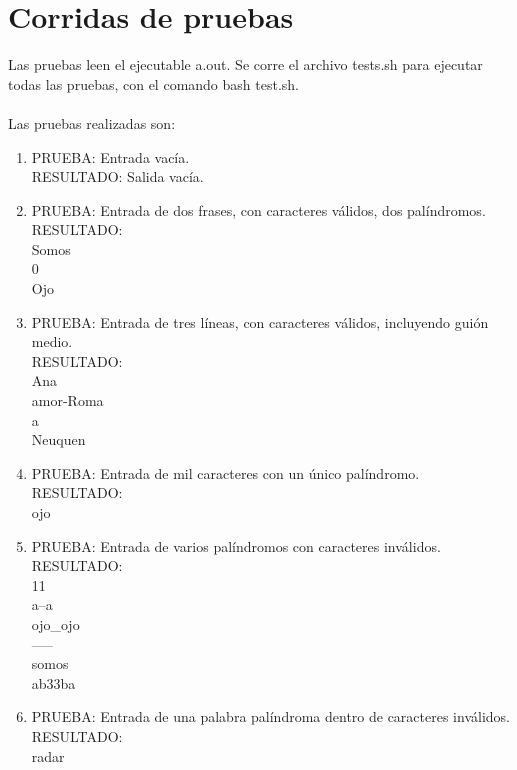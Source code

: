 \documentclass[a4paper,10pt]{article}
\begin{document}
\section{Corridas de pruebas}
Las pruebas leen el ejecutable a.out. Se corre el archivo tests.sh para ejecutar todas las pruebas, con el comando bash test.sh.\\
\\
Las pruebas realizadas son:\\
\begin{enumerate}[1.]
	\item PRUEBA: Entrada vac\'ia.\\
	RESULTADO: Salida vac\'ia.\\

	\item PRUEBA: Entrada de dos frases, con caracteres v\'alidos, dos pal\'indromos.\\
	RESULTADO:\\
	Somos\\
	0\\
	Ojo\\

	\item PRUEBA: Entrada de tres l\'ineas, con caracteres v\'alidos, incluyendo gui\'on medio.\\
	RESULTADO:\\
	Ana\\
	amor-Roma\\
	a\\
	Neuquen\\

	\item PRUEBA: Entrada de mil caracteres con un \'unico pal\'indromo.\\
	RESULTADO:\\
	ojo\\

	\item PRUEBA: Entrada de varios pal\'indromos con caracteres inv\'alidos.\\
	RESULTADO:\\
	11\\
	a--a\\
	ojo\_ojo\\
	-----\\
	somos\\
	ab33ba\\

	\item PRUEBA: Entrada de una palabra pal\'indroma dentro de caracteres inv\'alidos.\\
	RESULTADO:\\
	radar\\


\end{enumerate}
\end{document}
